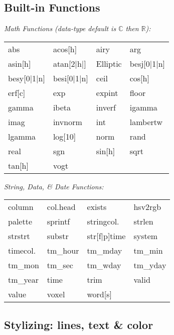 \subsection*{Built-in Functions}

\textit{Math Functions (data-type default is $\mathbb{C}$ then $\mathbb{R}$):}\\
{\footnotesize
\begin{tabular}{l l l l}
    abs         & acos[h]       & airy      & arg       \\
    asin[h]     & atan[2|h|]    & Elliptic  & besj[0|1|n]       \\
    besy[0|1|n] & besi[0|1|n]   & ceil      & cos[h]    \\
    erf[c]      & exp           & expint    & floor     \\
    gamma       & ibeta         & inverf    & igamma    \\
    imag        & invnorm       & int       & lambertw  \\
    lgamma      & log[10]       & norm      & rand      \\
    real        & sgn           & sin[h]    & sqrt      \\
    tan[h]      & vogt
\end{tabular}}\vspace{2mm}

\textit{String, Data, \& Date Functions:}\\
{\footnotesize
\begin{tabular}{l l l l}
    column          & col.head      & exists        & hsv2rgb       \\
    palette         & sprintf       & stringcol.    & strlen        \\
    strstrt         & substr        & str[f|p]time  & system        \\
    timecol.        & tm\_hour      & tm\_mday      & tm\_min       \\
    tm\_mon         & tm\_sec       & tm\_wday      & tm\_yday      \\
    tm\_year        & time          & trim          & valid         \\
    value           & voxel         & word[s]       \\
\end{tabular}}


\subsection*{Stylizing: lines, text \& color}

